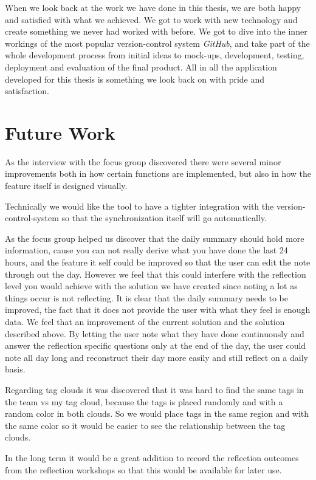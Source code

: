 When we look back at the work we have done in this thesis, we are both happy and satisfied with what we achieved. We got to work with new technology and create something we never had worked with before. We got to dive into the inner workings of the most popular version-control system \emph{GitHub}, and take part of the whole development process from initial ideas to mock-ups, development, testing, deployment and evaluation of the final product. All in all the application developed for this thesis is something we look back on with pride and satisfaction. 

\section{Future Work}
As the interview with the focus group discovered there were several minor improvements both in how certain functions are implemented, but also in how the feature itself is designed visually. 

Technically we would like the tool to have a tighter integration with the version-control-system so that the synchronization itself will go automatically.

As the focus group helped us discover that the daily summary should hold more information, cause you can not really derive what you have done the last 24 hours, and the feature it self could be improved so that the user can edit the note through out the day. However we feel that this could interfere with the reflection level you would achieve with the solution we have created since noting a lot as things occur is not reflecting. It is clear that the daily summary needs to be improved, the fact that it does not provide the user with what they feel is enough data. We feel that an improvement of the current solution and the solution described above. By letting the user note what they have done continuously and answer the reflection specific questions only at the end of the day, the user could note all day long and reconstruct their day more easily and still reflect on a daily basis.

Regarding tag clouds it was discovered that it was hard to find the same tags in the team vs my tag cloud, because the tags is placed randomly and with a random color in both clouds. So we would place tags in the same region and with the same color so it would be  easier to see the relationship between the tag clouds.

In the long term it would be a great addition to record the reflection outcomes from the reflection workshops so that this would be available for later use. 